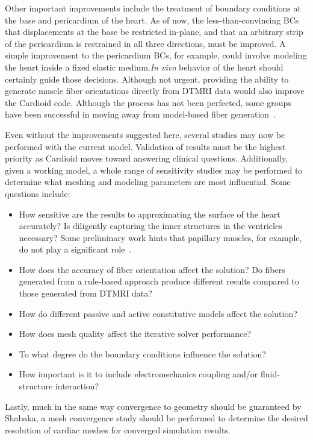 Other important improvements include the treatment of boundary conditions at the base and pericardium of the heart. As of now, the less-than-convincing BCs that displacements at the base be restricted in-plane, and that an arbitrary strip of the pericardium is restrained in all three directions, must be improved. A simple improvement to the pericardium BCs, for example, could involve modeling the heart inside a fixed elastic medium.\textit{In vivo} behavior of the heart should certainly guide those decisions. Although not urgent, providing the ability to generate muscle fiber orientations directly from DTMRI data would also improve the Cardioid code. Although the process has not been perfected, some groups have been successful in moving away from model-based fiber generation~\cite{yang_2012, zhukov_2003}.

Even without the improvements suggested here, several studies may now be performed with the current model. Validation of results must be the highest priority as Cardioid moves toward answering clinical questions. Additionally, given a working model, a whole range of sensitivity studies may be performed to determine what meshing and modeling parameters are most influential. Some questions include:
\begin{itemize}[noitemsep]
\item How sensitive are the results to approximating the surface of the heart accurately? Is diligently capturing the inner structures in the ventricles necessary? Some preliminary work hints that papillary muscles, for example, do not play a significant role~\cite{korte_2019}.
\item How does the accuracy of fiber orientation affect the solution? Do fibers generated from a rule-based approach produce different results compared to those generated from DTMRI data?
\item How do different passive and active constitutive models affect the solution?
\item How does mesh quality affect the iterative solver performance?
\item To what degree do the boundary conditions influence the solution?
\item How important is it to include electromechanics coupling and/or fluid-structure interaction?
\end{itemize} 
Lastly, much in the same way convergence to geometry should be guaranteed by Shabaka, a mesh convergence study should be performed to determine the desired resolution of cardiac meshes for converged simulation results.

